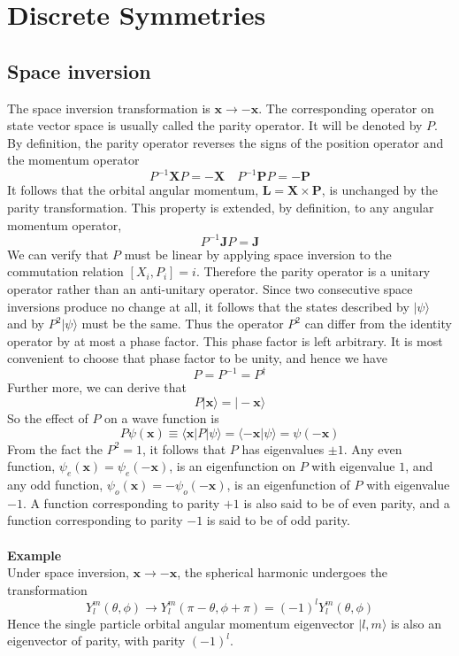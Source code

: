 \documentclass[cyan]{elegantnote}
\begin{document}
\chapter{Discrete Symmetries}
\section{Space inversion}
The space inversion transformation is $\bm{x} \to -\bm{x}$. The corresponding operator on state vector space is usually called the parity operator. It will be denoted by $P$. By definition, the parity operator reverses the signs of the position operator and the momentum operator
\[P^{-1}\bm{X}P = -\bm{X} \quad P^{-1}\bm{P}P = -\bm{P}\]
It follows that the orbital angular momentum, $\bm{L} = \bm{X}\times\bm{P}$, is unchanged by the parity transformation. This property is extended, by definition, to any angular momentum operator,
\[P^{-1}\bm{J}P = \bm{J}\]
We can verify that $P$ must be linear by applying space inversion to the commutation relation $[X_i,P_i] = i$. Therefore the parity operator is a unitary operator rather than an anti-unitary operator. Since two consecutive space inversions produce no change at all, it follows that the states described by $|\psi\rangle$ and by $P^2|\psi\rangle$ must be the same. Thus the
operator $P^2$ can differ from the identity operator by at most a phase factor. This phase factor is left arbitrary. It is most convenient to choose that phase factor to be unity, and hence we have
\[P = P^{-1} = P^{\dagger}\]
Further more, we can derive that
\[P|\bm{x}\rangle = |-\bm{x}\rangle\]
So the effect of $P$ on a wave function is
\[P\psi(\bm{x}) \equiv \langle \bm{x} | P | \psi\rangle = \langle -\bm{x} | \psi\rangle = \psi(-\bm{x})\]
From the fact the $P^2=1$, it follows that $P$ has eigenvalues $\pm 1$. Any even function, $\psi_e(\bm{x}) = \psi_e(-\bm{x})$, is an eigenfunction on $P$ with eigenvalue $1$, and any odd function, $\psi_o(\bm{x}) = -\psi_o(-\bm{x})$, is an eigenfunction of $P$ with eigenvalue $-1$.
A function corresponding to parity $+1$ is also said to be of even parity, and a function corresponding to parity $-1$ is said to be of odd parity.\\ \\
\textbf{Example}\\
Under space inversion, $\bm{x} \to -\bm{x}$, the spherical harmonic undergoes the transformation
\[Y_l^m(\theta,\phi) \to Y_l^m(\pi-\theta,\phi+\pi) = (-1)^l Y_l^m(\theta,\phi)\]
Hence the single particle orbital angular momentum eigenvector $|l,m\rangle$ is also an eigenvector of parity, with parity $(-1)^l$.\\
\end{document}
